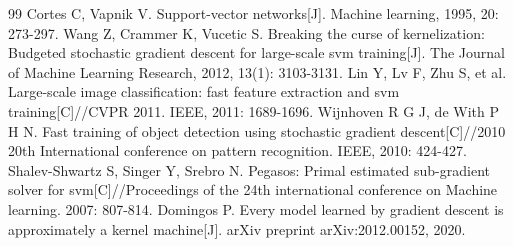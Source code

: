 \documentclass[conference]{IEEEtran}
\begin{document}
	\begin{thebibliography}{99}
		 Cortes C, Vapnik V. Support-vector networks[J]. Machine learning, 1995, 20: 273-297.
		 Wang Z, Crammer K, Vucetic S. Breaking the curse of kernelization: Budgeted stochastic gradient descent for large-scale svm training[J]. The Journal of Machine Learning Research, 2012, 13(1): 3103-3131.
		 Lin Y, Lv F, Zhu S, et al. Large-scale image classification: fast feature extraction and svm training[C]//CVPR 2011. IEEE, 2011: 1689-1696.
		 Wijnhoven R G J, de With P H N. Fast training of object detection using stochastic gradient descent[C]//2010 20th International conference on pattern recognition. IEEE, 2010: 424-427.
		 Shalev-Shwartz S, Singer Y, Srebro N. Pegasos: Primal estimated sub-gradient solver for svm[C]//Proceedings of the 24th international conference on Machine learning. 2007: 807-814.
		 Domingos P. Every model learned by gradient descent is approximately a kernel machine[J]. arXiv preprint arXiv:2012.00152, 2020.
	\end{thebibliography}
	
\end{document}
